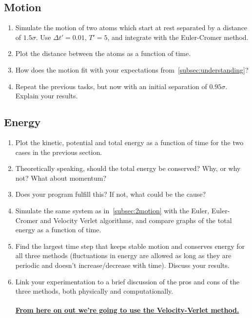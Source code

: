 \documentclass[11pt,british,a4paper]{report}
\begin{document}
\subsection{Motion}\label{subsec:2motion}
\begin{enumerate}[label=\roman*.]
    \item Simulate the motion of two atoms which start at rest separated by a distance of \(\num{1.5}\sigma\). Use \(\Delta t'=\num{0.01}\), \(T' = 5\), and integrate with the Euler-Cromer method.
    \item Plot the distance between the atoms as a function of time.
    \item How does the motion fit with your expectations from~\vref{subsec:understanding}?
    \item Repeat the previous tasks, but now with an initial separation of \(\num{0.95}\sigma\). Explain your results.
\end{enumerate}

\subsection{Energy}
\begin{enumerate}[label=\roman*.]
    \item Plot the kinetic, potential and total energy as a function of time for the two cases in the previous section.
    \item Theoretically speaking, should the total energy be conserved? Why, or why not? What about momentum?
    \item Does your program fulfill this? If not, what could be the cause?
    \item Simulate the same system as in~\vref{subsec:2motion} with the Euler, Euler-Cromer and Velocity Verlet algorithms, and compare graphs of the total energy as a function of time.
    \item Find the largest time step that keeps stable motion and conserves energy for all three methods (fluctuations in energy are allowed as long as they are periodic and doesn't increase/decrease with time). Discuss your results.
    \item Link your experimentation to a brief discussion of the pros and cons of the three methods, both physically and computationally. 
    \\\\ \underline{\textbf{From here on out we're going to use the Velocity-Verlet method.}}
\end{enumerate}
\end{document}
